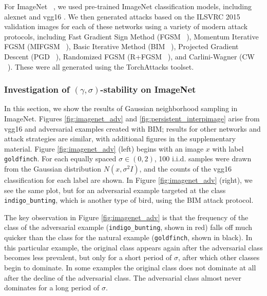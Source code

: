 For ImageNet ~\cite{Imagenet-old}, we used pre-trained ImageNet classification models, including alexnet \cite{alexnet} and vgg16 \cite{simonyan2014very}.
We then generated attacks based on the ILSVRC 2015 ~\cite{ILSVRC15} validation images for each of these networks using a variety of modern attack protocols, including Fast Gradient Sign Method (FGSM ~\cite{goodfellow_explaining_2014}), Momentum Iterative FGSM (MIFGSM ~\cite{dongMIFGSM}), Basic Iterative Method (BIM ~\cite{kurakin_adversarial_2016}), Projected Gradient Descent (PGD ~\cite{madry_towards_2017}), Randomized FGSM (R+FGSM ~\cite{tramer2018ensemble}), and Carlini-Wagner (CW ~\cite{carlini_towards_2016}). These were all generated using the TorchAttacks \cite{kim2021torchattacks} toolset.

\subsubsection{Investigation of $(\gamma, \sigma)$-stability on ImageNet}

In this section, we show the results of Gaussian neighborhood sampling in ImageNet. Figures \ref{fig:imagenet_adv} and \ref{fig:persistent_interpimage} arise from vgg16 and adversarial examples created with BIM; results for other networks and attack strategies are similar, with additional figures in the supplementary material. Figure \ref{fig:imagenet_adv} (left) begins with an image $x$ with label \texttt{goldfinch}. For each equally spaced $\sigma\in(0,2)$, 100 i.i.d. samples were drawn from the Gaussian distribution $N(x,\sigma^2I)$, and the counts of the vgg16 classification for each label are shown. In Figure \ref{fig:imagenet_adv} (right), we see the same plot, but for an adversarial example targeted at the class \texttt{indigo\_bunting}, which is another type of bird, using the BIM attack protocol. %

The key observation in Figure \ref{fig:imagenet_adv} is that the frequency of the class of the adversarial example (\texttt{indigo\_bunting}, shown in red) falls off much quicker than the class for the natural example (\texttt{goldfinch}, shown in black). In this particular example, the original class appears again after the adversarial class becomes less prevalent, but only for a short period of $\sigma$, after which other classes begin to dominate. In some examples the original class does not dominate at all after the decline of the adversarial class. The adversarial class almost never dominates for a long period of $\sigma$. 


